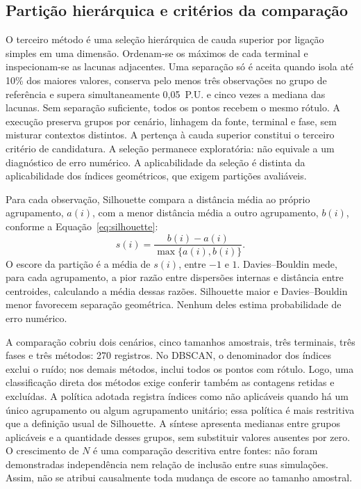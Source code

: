 \documentclass[
	12pt,				%
	openright,			%
	oneside,			%
	a4paper,			%
	chapter=TITLE,		%
	section=TITLE,		%
	subsection=TITLE,	%
	subsubsection=TITLE,%
	english,			%
	brazilian			%
	]{abntex2}
\theoremstyle{definition}
\begin{document}
\subsection{Partição hierárquica e critérios da comparação}

O terceiro método é uma seleção hierárquica de cauda superior por ligação
simples em uma dimensão. Ordenam-se os máximos de cada terminal e
inspecionam-se as lacunas adjacentes. Uma separação só é aceita quando
isola até 10\% dos maiores valores, conserva pelo menos três observações
no grupo de referência e supera simultaneamente 0,05~P.U. e cinco vezes
a mediana das lacunas. Sem separação suficiente, todos os pontos recebem
o mesmo rótulo. A execução preserva grupos por cenário, linhagem da fonte,
terminal e fase, sem misturar contextos distintos.
A pertença à cauda superior constitui o terceiro critério de candidatura. A seleção permanece exploratória: não equivale a um
diagnóstico de erro numérico. A aplicabilidade da seleção é distinta da
aplicabilidade dos índices geométricos, que exigem partições avaliáveis.

Para cada observação, Silhouette compara a distância média ao próprio
agrupamento, $a(i)$, com a menor distância média a outro agrupamento, $b(i)$,
conforme a Equação~\ref{eq:silhouette}:
\begin{equation}
\label{eq:silhouette}
s(i)=\frac{b(i)-a(i)}{\max\{a(i),b(i)\}}.
\end{equation}
O escore da partição é a média de $s(i)$, entre $-1$ e $1$.
Davies--Bouldin mede, para cada agrupamento, a pior razão entre dispersões
internas e distância entre centroides, calculando a média dessas razões.
Silhouette maior e Davies--Bouldin menor favorecem separação geométrica.
Nenhum deles estima probabilidade de erro numérico.

A comparação cobriu dois cenários, cinco tamanhos amostrais, três terminais,
três fases e três métodos: 270 registros. No DBSCAN, o denominador dos
índices exclui o ruído; nos demais métodos, inclui todos os pontos com
rótulo. Logo, uma classificação direta dos métodos exige conferir também
as contagens retidas e excluídas. A política adotada registra índices como
não aplicáveis quando há um único agrupamento ou algum agrupamento unitário;
essa política é mais restritiva que a definição usual de Silhouette.
A síntese apresenta medianas entre grupos aplicáveis e a quantidade desses
grupos, sem substituir valores ausentes por zero. O crescimento de $N$
é uma comparação descritiva entre fontes: não foram demonstradas
independência nem relação de inclusão entre suas simulações. Assim,
não se atribui causalmente toda mudança de escore ao tamanho amostral.
\end{document}
